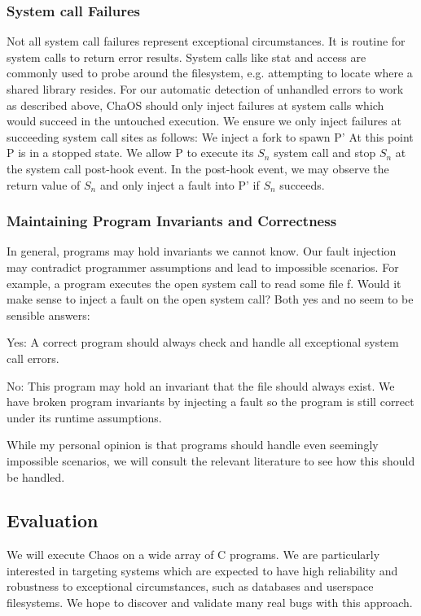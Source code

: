 \subsubsection{System call Failures}
\label{syscallfailures}
Not all system call failures represent exceptional circumstances. It is routine for system calls to return error results. System calls like stat and access are commonly used to probe around the filesystem, e.g. attempting to locate where a shared library resides.
For our automatic detection of unhandled errors to work as described above, ChaOS should only inject failures at system calls which would succeed in the untouched execution. We ensure we only inject failures at succeeding system call sites as follows: 
We inject a fork to spawn P’
At this point P is in a stopped state.
We allow P to execute its $S_n$ system call and stop $S_n$ at the system call post-hook event. In the post-hook event, we may observe the return value of $S_n$ and only inject a fault into P’ if $S_n$ succeeds.

\subsubsection{Maintaining Program Invariants and Correctness}
In general, programs may hold invariants we cannot know. Our fault injection may contradict programmer assumptions and lead to impossible scenarios. For example, a program executes the open system call to read some file f. Would it make sense to inject a fault on the open system call? Both yes and no seem to be sensible answers:
\begin{compactitem}
\item Yes: A correct program should always check and handle all exceptional system call errors.
\item No: This program may hold an invariant that the file should always exist. We have broken program invariants by injecting a fault so the program is still correct under its runtime assumptions.
\end{compactitem}
While my personal opinion is that programs should handle even seemingly impossible scenarios, we will consult the relevant literature to see how this should be handled.

\subsection{Evaluation}
We will execute Chaos on a wide array of C programs. We are particularly interested in targeting systems which are expected to have high reliability and robustness to exceptional circumstances, such as databases and userspace filesystems. We hope to discover and validate many real bugs with this approach.

